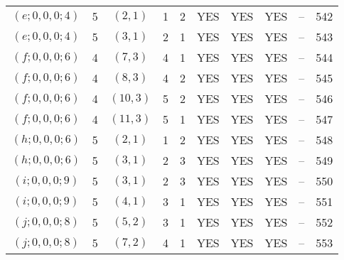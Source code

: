 \begin{longtable}{|c|c|c|c|c|c|c|c|c|c|}
$(e; 0, 0, 0; 4)$ & 5 & $(2, 1)$ & 1 & 2 & YES & YES & YES & -- & 542\\
$(e; 0, 0, 0; 4)$ & 5 & $(3, 1)$ & 2 & 1 & YES & YES & YES & -- & 543\\
$(f; 0, 0, 0; 6)$ & 4 & $(7, 3)$ & 4 & 1 & YES & YES & YES & -- & 544\\
$(f; 0, 0, 0; 6)$ & 4 & $(8, 3)$ & 4 & 2 & YES & YES & YES & -- & 545\\
$(f; 0, 0, 0; 6)$ & 4 & $(10, 3)$ & 5 & 2 & YES & YES & YES & -- & 546\\
$(f; 0, 0, 0; 6)$ & 4 & $(11, 3)$ & 5 & 1 & YES & YES & YES & -- & 547\\
$(h; 0, 0, 0; 6)$ & 5 & $(2, 1)$ & 1 & 2 & YES & YES & YES & -- & 548\\
$(h; 0, 0, 0; 6)$ & 5 & $(3, 1)$ & 2 & 3 & YES & YES & YES & -- & 549\\
$(i; 0, 0, 0; 9)$ & 5 & $(3, 1)$ & 2 & 3 & YES & YES & YES & -- & 550\\
$(i; 0, 0, 0; 9)$ & 5 & $(4, 1)$ & 3 & 1 & YES & YES & YES & -- & 551\\
$(j; 0, 0, 0; 8)$ & 5 & $(5, 2)$ & 3 & 1 & YES & YES & YES & -- & 552\\
$(j; 0, 0, 0; 8)$ & 5 & $(7, 2)$ & 4 & 1 & YES & YES & YES & -- & 553
\end{longtable}
